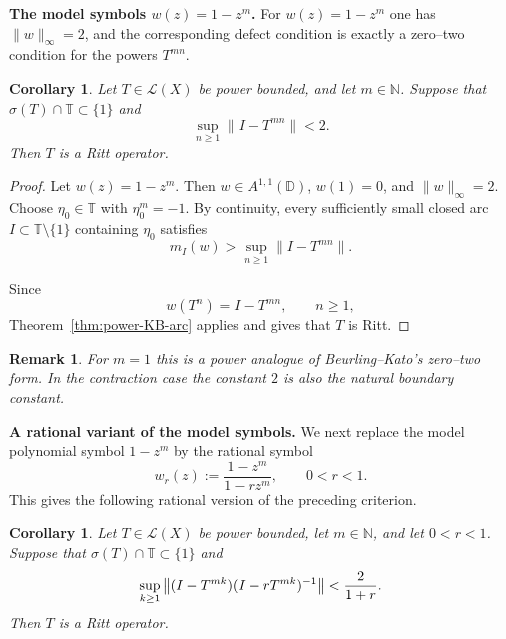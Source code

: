 \documentclass[11pt]{amsart}
\numberwithin{equation}{section}
\newtheorem{corollary}[theorem]{Corollary}
\newtheorem{remark}[theorem]{Remark}
\theoremstyle{definition}
\theoremstyle{plain}
\def\N{\mathbb{N}}
\def\T{\mathbb{T}}
\def\L{L}
\def\D{\mathbb{D}}
\renewcommand{\L}{\mathcal L}
\begin{document}
\par\medskip
\noindent\textbf{The model symbols $w(z)=1-z^m$.}
For \(w(z)=1-z^m\) one has \(\|w\|_{\infty}=2\), and the corresponding defect
condition is exactly a zero--two condition for the powers \(T^{mn}\).

\begin{corollary}\label{bk-example}
\label{cor:1-zm}
Let \(T\in\L(X)\) be power bounded, and let \(m\in\N\).  Suppose that
\(\sigma(T)\cap\T\subset\{1\}\) and
\begin{equation}\label{eq:defect-1-zm}
        \sup_{n\ge1}\|I-T^{mn}\|<2 .
\end{equation}
Then \(T\) is a Ritt operator.
\end{corollary}

\begin{proof}
Let \(w(z)=1-z^m\).  Then \(w\in A^{1,1}(\D)\), \(w(1)=0\), and
\(\|w\|_{\infty}=2\).  Choose \(\eta_0\in\T\) with
\(\eta_0^m=-1\).  
By continuity, every sufficiently small closed arc
$I\subset\T\setminus\{1\}$ containing $\eta_0$ satisfies
\[
        m_I(w)>\sup_{n\ge1}\|I-T^{mn}\|.
\]

Since
\[
        w(T^n)=I-T^{mn},\qquad n\ge1,
\]
Theorem~\ref{thm:power-KB-arc} applies and gives that \(T\) is Ritt.
\end{proof}

\begin{remark}
For \(m=1\) this is a power analogue of Beurling--Kato's zero--two form.  In the
contraction case the constant \(2\) is also the natural boundary constant.
\end{remark}

\par\medskip
\noindent\textbf{A rational variant of the model symbols.}
We next replace the model polynomial symbol \(1-z^m\) by the rational
symbol
\[
        w_r(z):=\frac{1-z^m}{1-rz^m},
        \qquad 0<r<1.
\]
This gives the following rational version of the preceding criterion.

\begin{corollary}\label{cor:rational-regularised}
Let \(T\in\L(X)\) be power bounded, let \(m\in\N\), and let \(0<r<1\).
Suppose that \(\sigma(T)\cap\T\subset\{1\}\) and
\begin{equation}\label{eq:rational-regularised-defect}
        \sup_{k\ge1}
        \left\|
        (I-T^{mk})(I-rT^{mk})^{-1}
        \right\|
        <
        {2\over 1+r}.
\end{equation}
Then \(T\) is a Ritt operator.
\end{corollary}
\end{document}
